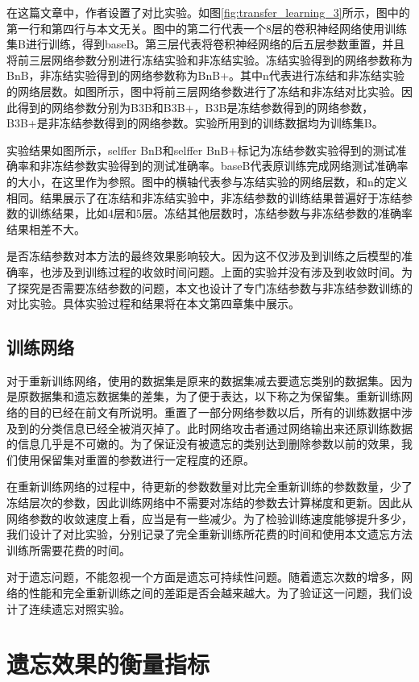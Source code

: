 在这篇文章\cite{yosinski_2014_NIPS}中，作者设置了对比实验。如图\ref{fig:transfer_learning_3}所示，图中的第一行和第四行与本文无关。图中的第二行代表一个8层的卷积神经网络使用训练集B进行训练，得到baseB。第三层代表将卷积神经网络的后五层参数重置，并且将前三层网络参数分别进行冻结实验和非冻结实验。冻结实验得到的网络参数称为BnB，非冻结实验得到的网络参数称为BnB+。其中n代表进行冻结和非冻结实验的网络层数。如图所示，图中将前三层网络参数进行了冻结和非冻结对比实验。因此得到的网络参数分别为B3B和B3B+，B3B是冻结参数得到的网络参数，B3B+是非冻结参数得到的网络参数。实验所用到的训练数据均为训练集B。

实验结果如图所示，selffer BnB和selffer BnB+标记为冻结参数实验得到的测试准确率和非冻结参数实验得到的测试准确率。baseB代表原训练完成网络测试准确率的大小，在这里作为参照。图中的横轴代表参与冻结实验的网络层数，和n的定义相同。结果展示了在冻结和非冻结实验中，非冻结参数的训练结果普遍好于冻结参数的训练结果，比如4层和5层。冻结其他层数时，冻结参数与非冻结参数的准确率结果相差不大。

是否冻结参数对本方法的最终效果影响较大。因为这不仅涉及到训练之后模型的准确率，也涉及到训练过程的收敛时间问题。上面的实验并没有涉及到收敛时间。为了探究是否需要冻结参数的问题，本文也设计了专门冻结参数与非冻结参数训练的对比实验。具体实验过程和结果将在本文第四章集中展示。

\subsection{训练网络}

对于重新训练网络，使用的数据集是原来的数据集减去要遗忘类别的数据集。因为是原数据集和遗忘数据集的差集，为了便于表达，以下称之为保留集。重新训练网络的目的已经在前文有所说明。重置了一部分网络参数以后，所有的训练数据中涉及到的分类信息已经全被消灭掉了。此时网络攻击者通过网络输出来还原训练数据的信息几乎是不可嫩的。为了保证没有被遗忘的类别达到删除参数以前的效果，我们使用保留集对重置的参数进行一定程度的还原。

在重新训练网络的过程中，待更新的参数数量对比完全重新训练的参数数量，少了冻结层次的参数，因此训练网络中不需要对冻结的参数去计算梯度和更新。因此从网络参数的收敛速度上看，应当是有一些减少。为了检验训练速度能够提升多少，我们设计了对比实验，分别记录了完全重新训练所花费的时间和使用本文遗忘方法训练所需要花费的时间。

对于遗忘问题，不能忽视一个方面是遗忘可持续性问题。随着遗忘次数的增多，网络的性能和完全重新训练之间的差距是否会越来越大。为了验证这一问题，我们设计了连续遗忘对照实验。

\section{遗忘效果的衡量指标} \label{forget_evaluation_index}

